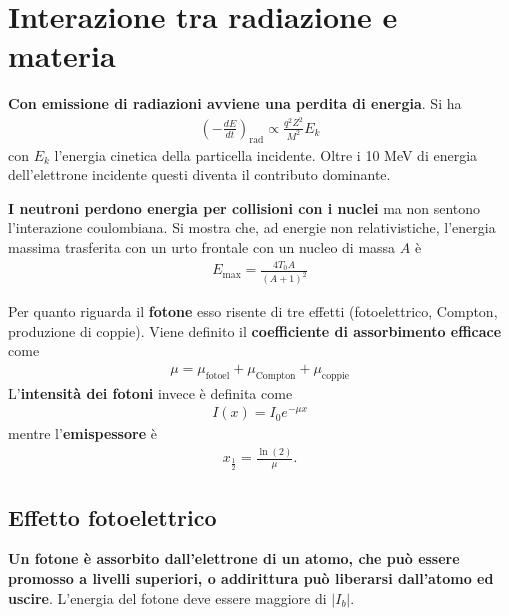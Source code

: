 \documentclass[a4paper,11pt,twoside,openany]{book}
\theoremstyle{definition}
\theoremstyle{plain}
\theoremstyle{plain}
\theoremstyle{definition}
\begin{document}
\section[Interazioni]{Interazione tra radiazione e materia} %
\textbf{Con emissione di radiazioni avviene una perdita di energia}. Si ha
\begin{equation}\begin{split}
\left(-\frac{dE}{dt}\right)_{\textrm{rad}}\propto \frac{q^2Z^2}{M^2}E_k
\end{split}\end{equation}
con $E_k$ l'energia cinetica della particella incidente. Oltre i 10 MeV di energia dell'elettrone incidente questi diventa il contributo dominante.

\textbf{I neutroni perdono energia per collisioni con i nuclei} ma non sentono l'interazione coulombiana. Si mostra che, ad energie non relativistiche, l'energia massima trasferita con un urto frontale con un nucleo di massa $A$ è
\begin{equation}\begin{split}
E_{\max}=\frac{4T_0A}{\left(A+1\right)^2}
\end{split}\end{equation}

Per quanto riguarda il \textbf{fotone} esso risente di tre effetti (fotoelettrico, Compton, produzione di coppie). Viene definito il \textbf{coefficiente di assorbimento efficace} come
\begin{equation}\begin{split}
\mu=\mu_{\textrm{fotoel}}+\mu_{\textrm{Compton}}+\mu_{\textrm{coppie}}
\end{split}\end{equation}
L'\textbf{intensità dei fotoni} invece è definita come
\begin{equation}\begin{split}
I\left(x\right)=I_0e^{-\mu x}
\end{split}\end{equation}
mentre l'\textbf{emispessore} è
\begin{equation}\begin{split}
x_{\frac{1}{2}}=\frac{\ln{\left(2\right)}}{\mu}.
\end{split}\end{equation}

\subsection{Effetto fotoelettrico} %
\textbf{Un fotone è assorbito dall'elettrone di un atomo, che può essere promosso a livelli superiori, o addirittura può liberarsi dall'atomo ed uscire}. L'energia del fotone deve essere maggiore di $|I_b|$.
\end{document}
